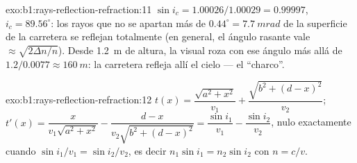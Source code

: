 \begin{solution}{exo:b1:rays-reflection-refraction:11}
$\sin i_c = 1.00026/1.00029 = 0.99997$, $i_c = 89.56^\circ$: los rayos
que no se apartan más de $0.44^\circ = \qty{7.7}{mrad}$ de la superficie
de la carretera se reflejan totalmente (en general, el ángulo rasante
vale $\approx \sqrt{2\Delta n/n}$). Desde \qty{1.2}{m} de altura, la
visual roza con ese ángulo más allá de $1.2/0.0077 \approx \qty{160}{m}$:
la carretera refleja allí el cielo --- el ``charco''.
\end{solution}

\begin{solution}{exo:b1:rays-reflection-refraction:12}
$t(x) = \dfrac{\sqrt{a^2 + x^2}}{v_1} + \dfrac{\sqrt{b^2 + (d - x)^2}}{v_2}$;
$t'(x) = \dfrac{x}{v_1\sqrt{a^2 + x^2}} - \dfrac{d - x}{v_2\sqrt{b^2 + (d - x)^2}}
= \dfrac{\sin i_1}{v_1} - \dfrac{\sin i_2}{v_2}$, nulo exactamente cuando
$\sin i_1/v_1 = \sin i_2/v_2$, es decir $n_1\sin i_1 = n_2\sin i_2$ con
$n = c/v$.
\end{solution}

